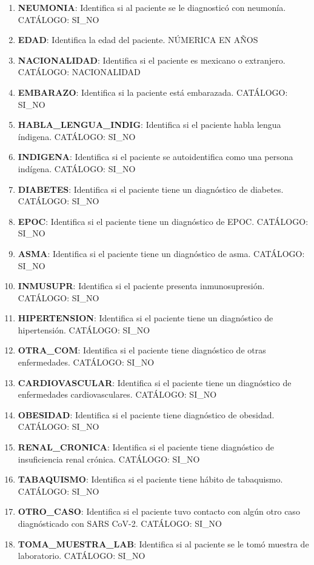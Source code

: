\begin{enumerate}
	\item \textbf{NEUMONIA}: Identifica si al paciente se le diagnosticó con neumonía. CATÁLOGO: SI\_NO
	\item \textbf{EDAD}: Identifica la edad del paciente. NÚMERICA EN AÑOS
	\item \textbf{NACIONALIDAD}: Identifica si el paciente es mexicano o extranjero. CATÁLOGO: NACIONALIDAD
	\item \textbf{EMBARAZO}: Identifica si la paciente está embarazada. CATÁLOGO: SI\_NO
	\item \textbf{HABLA\_LENGUA\_INDIG}: Identifica si el paciente habla lengua índigena. CATÁLOGO: SI\_NO
	\item \textbf{INDIGENA}: Identifica si el paciente se autoidentifica como una persona indígena. CATÁLOGO: SI\_NO
	\item \textbf{DIABETES}: Identifica si el paciente tiene un diagnóstico de diabetes. CATÁLOGO: SI\_NO
	\item \textbf{EPOC}: Identifica si el paciente tiene un diagnóstico de EPOC. CATÁLOGO: SI\_NO
	\item \textbf{ASMA}: Identifica si el paciente tiene un diagnóstico de asma. CATÁLOGO: SI\_NO
	\item \textbf{INMUSUPR}: Identifica si el paciente presenta inmunosupresión. CATÁLOGO: SI\_NO
	\item \textbf{HIPERTENSION}: Identifica si el paciente tiene un diagnóstico de hipertensión. CATÁLOGO: SI\_NO
	\item \textbf{OTRA\_COM}: Identifica si el paciente tiene diagnóstico de otras enfermedades. CATÁLOGO: SI\_NO
	\item \textbf{CARDIOVASCULAR}: Identifica si el paciente tiene un diagnóstico de enfermedades cardiovasculares. CATÁLOGO: SI\_NO
	\item \textbf{OBESIDAD}: Identifica si el paciente tiene diagnóstico de obesidad. CATÁLOGO: SI\_NO
	\item \textbf{RENAL\_CRONICA}: Identifica si el paciente tiene diagnóstico de insuficiencia renal crónica. CATÁLOGO: SI\_NO
	\item \textbf{TABAQUISMO}: Identifica si el paciente tiene hábito de tabaquismo. CATÁLOGO: SI\_NO
	\item \textbf{OTRO\_CASO}: Identifica si el paciente tuvo contacto con algún otro caso diagnósticado con SARS CoV-2. CATÁLOGO: SI\_NO
	\item \textbf{TOMA\_MUESTRA\_LAB}: Identifica si al paciente se le tomó muestra de laboratorio. CATÁLOGO: SI\_NO

\end{enumerate}
